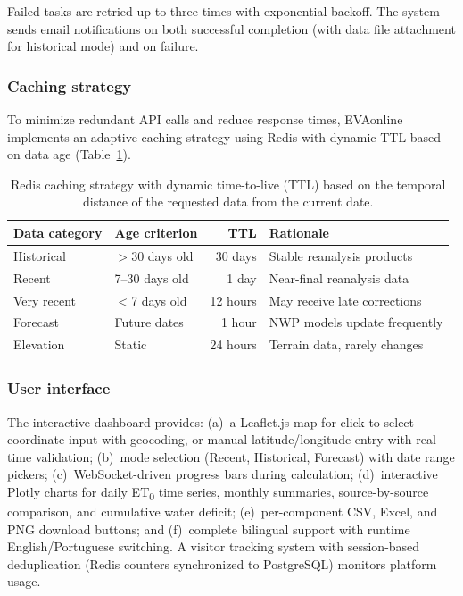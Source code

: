 \documentclass[preprint,review,12pt]{elsarticle}
\begin{document}
Failed tasks are retried up to three times with exponential backoff. The
system sends email notifications on both successful completion (with data file
attachment for historical mode) and on failure.

\subsubsection*{Caching strategy}

To minimize redundant API calls and reduce response times, EVAonline implements
an adaptive caching strategy using Redis with dynamic TTL based on data age
(Table~\ref{tab:cache}).

\begin{table}[htbp]
\centering
\caption{Redis caching strategy with dynamic time-to-live (TTL) based on the
temporal distance of the requested data from the current date.}
\label{tab:cache}
\begin{tabular}{@{}llrl@{}}
\toprule
Data category & Age criterion & TTL & Rationale \\
\midrule
Historical & $>$30 days old & 30 days & Stable reanalysis products \\
Recent & 7--30 days old & 1 day & Near-final reanalysis data \\
Very recent & $<$7 days old & 12 hours & May receive late corrections \\
Forecast & Future dates & 1 hour & NWP models update frequently \\
Elevation & Static & 24 hours & Terrain data, rarely changes \\
\bottomrule
\end{tabular}
\end{table}

\subsubsection*{User interface}

The interactive dashboard provides: (a)~a Leaflet.js map for click-to-select
coordinate input with geocoding, or manual latitude/longitude entry with
real-time validation; (b)~mode selection (Recent, Historical, Forecast) with
date range pickers; (c)~WebSocket-driven progress bars during calculation;
(d)~interactive Plotly charts for daily ET\textsubscript{0} time series,
monthly summaries, source-by-source comparison, and cumulative water deficit;
(e)~per-component CSV, Excel, and PNG download buttons; and (f)~complete
bilingual support with runtime English/Portuguese switching. A visitor tracking
system with session-based deduplication (Redis counters synchronized to
PostgreSQL) monitors platform usage.
\end{document}

